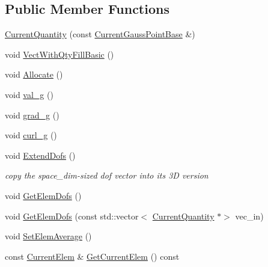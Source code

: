 \subsection*{Public Member Functions}
\begin{DoxyCompactItemize}
\item 
\mbox{\hyperlink{classfemus_1_1_current_quantity_a33a90d4e1c9e39be4ca7400ce36a5c53}{Current\+Quantity}} (const \mbox{\hyperlink{classfemus_1_1_current_gauss_point_base}{Current\+Gauss\+Point\+Base}} \&)
\item 
void \mbox{\hyperlink{classfemus_1_1_current_quantity_ab1394e79cb5fb9fc00211b01114f2308}{Vect\+With\+Qty\+Fill\+Basic}} ()
\item 
void \mbox{\hyperlink{classfemus_1_1_current_quantity_a7423a2a8c30f4c64461a384a3570b8a0}{Allocate}} ()
\item 
void \mbox{\hyperlink{classfemus_1_1_current_quantity_ac6de4abdb84f78d6ce2fce30b6d4c58e}{val\+\_\+g}} ()
\item 
void \mbox{\hyperlink{classfemus_1_1_current_quantity_a818bc04e65ca13c0a0b6e8fa3a81184d}{grad\+\_\+g}} ()
\item 
void \mbox{\hyperlink{classfemus_1_1_current_quantity_ac49ad9c2373c209ecc2b54eb3d0cde9d}{curl\+\_\+g}} ()
\item 
void \mbox{\hyperlink{classfemus_1_1_current_quantity_aa1c7d204f7efc0d0637a087abf304eaf}{Extend\+Dofs}} ()
\begin{DoxyCompactList}\small\item\em copy the space\+\_\+dim-\/sized dof vector into its 3D version \end{DoxyCompactList}\item 
void \mbox{\hyperlink{classfemus_1_1_current_quantity_ac679962446671495a5ee163d5aa3466f}{Get\+Elem\+Dofs}} ()
\item 
void \mbox{\hyperlink{classfemus_1_1_current_quantity_a3a28e3f7dda6aaa566d754262866ffd2}{Get\+Elem\+Dofs}} (const std\+::vector$<$ \mbox{\hyperlink{classfemus_1_1_current_quantity}{Current\+Quantity}} $\ast$$>$ vec\+\_\+in)
\item 
void \mbox{\hyperlink{classfemus_1_1_current_quantity_a10840b0060347099e1d08eb7b501d054}{Set\+Elem\+Average}} ()
\item 
const \mbox{\hyperlink{classfemus_1_1_current_elem}{Current\+Elem}} \& \mbox{\hyperlink{classfemus_1_1_current_quantity_ae3ad0b4d7421700297005841524ec912}{Get\+Current\+Elem}} () const
\end{DoxyCompactItemize}
